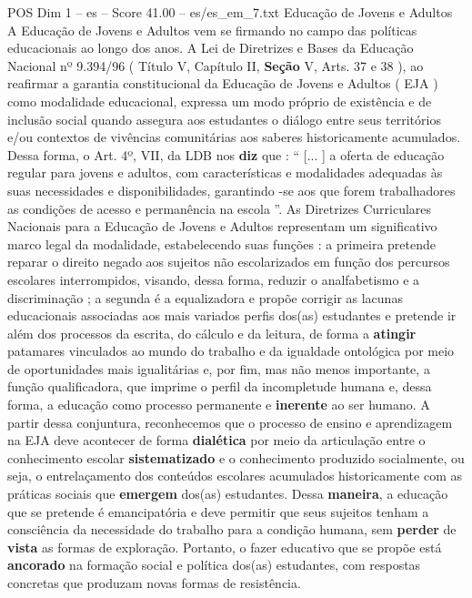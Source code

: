 \begin{textsample}{POS Dim 1 – es – Score 41.00 – es/es\_em\_7.txt}  \label{ex:f1_pos_197}
Educação de Jovens e Adultos A Educação de Jovens e Adultos vem se firmando no campo das políticas educacionais ao longo dos anos.
A Lei de Diretrizes e Bases da Educação Nacional nº 9.394/96 ( Título V, Capítulo II, \textbf{Seção} V, Arts. 37 e 38 ), ao reafirmar a garantia constitucional da Educação de Jovens e Adultos ( EJA ) como modalidade educacional, expressa um modo próprio de existência e de inclusão social quando assegura aos estudantes o diálogo entre seus territórios e/ou contextos de vivências comunitárias aos saberes historicamente acumulados.
Dessa forma, o Art. 4º, VII, da LDB nos \textbf{diz} que : “ [... ] a oferta de educação regular para jovens e adultos, com características e modalidades adequadas às suas necessidades e disponibilidades, garantindo -se aos que forem trabalhadores as condições de acesso e permanência na escola ”.
As Diretrizes Curriculares Nacionais para a Educação de Jovens e Adultos representam um significativo marco legal da modalidade, estabelecendo suas funções : a primeira pretende reparar o direito negado aos sujeitos não escolarizados em função dos percursos escolares interrompidos, visando, dessa forma, reduzir o analfabetismo e a discriminação ; a segunda é a equalizadora e propõe corrigir as lacunas educacionais associadas aos mais variados perfis dos(as) estudantes e pretende ir além dos processos da escrita, do cálculo e da leitura, de forma a \textbf{atingir} patamares vinculados ao mundo do trabalho e da igualdade ontológica por meio de oportunidades mais igualitárias e, por fim, mas não menos importante, a função qualificadora, que imprime o perfil da incompletude humana e, dessa forma, a educação como processo permanente e \textbf{inerente} ao ser humano.
A partir dessa conjuntura, reconhecemos que o processo de ensino e aprendizagem na EJA deve acontecer de forma \textbf{dialética} por meio da articulação entre o conhecimento escolar \textbf{sistematizado} e o conhecimento produzido socialmente, ou seja, o entrelaçamento dos conteúdos escolares acumulados historicamente com as práticas sociais que \textbf{emergem} dos(as) estudantes.
Dessa \textbf{maneira}, a educação que se pretende é emancipatória e deve permitir que seus sujeitos tenham a consciência da necessidade do trabalho para a condição humana, sem \textbf{perder} de \textbf{vista} as formas de exploração.
Portanto, o fazer educativo que se propõe está \textbf{ancorado} na formação social e política dos(as) estudantes, com respostas concretas que produzam novas formas de resistência.

\end{textsample}
